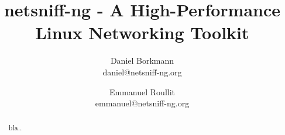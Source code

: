 \documentclass[times,10pt,twocolumn]{article}
\begin{document}
\title{netsniff-ng - A High-Performance Linux Networking Toolkit}

\author{Daniel Borkmann\\
daniel@netsniff-ng.org\\
\and
Emmanuel Roullit\\
emmanuel@netsniff-ng.org\\
}

\maketitle
\thispagestyle{empty}

\begin{abstract}
bla..
\end{abstract}


\nocite{*}


\end{document}
